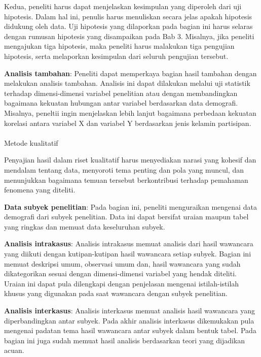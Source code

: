 \documentclass[
  indonesian,
  letterpaper,
]{scrbook}
\makeatletter
\let\oldparagraph\paragraph
\renewcommand{\paragraph}{
    \@ifstar
      \xxxParagraphStar
      \xxxParagraphNoStar
  }
\newcommand{\xxxParagraphStar}[1]{\oldparagraph*{#1}\mbox{}}
\newcommand{\xxxParagraphNoStar}[1]{\oldparagraph{#1}\mbox{}}
\makeatother
\begin{document}
Kedua, peneliti harus dapat menjelaskan kesimpulan yang diperoleh dari
uji hipotesis. Dalam hal ini, penulis harus menuliskan secara jelas
apakah hipotesis didukung oleh data. Uji hipotesis yang dilaporkan pada
bagian ini harus selaras dengan rumusan hipotesis yang disampaikan pada
Bab 3. Misalnya, jika peneliti mengajukan tiga hipotesis, maka peneliti
harus malakukan tiga pengujian hipotesis, serta melaporkan kesimpulan
dari seluruh pengujian tersebut.

\textbf{Analisis tambahan}: Peneliti dapat memperkaya bagian hasil
tambahan dengan melakukan analisis tambahan. Analisis ini dapat
dilakukan melalui uji statistik terhadap dimensi-dimensi variabel
penelitian atau dengan membandingkan bagaimana kekuatan hubungan antar
variabel berdasarkan data demografi. Misalnya, peneltii ingin
menjelaskan lebih lanjut bagaimana perbedaan kekuatan korelasi antara
variabel X dan variabel Y berdasarkan jenis kelamin partisipan.

\paragraph{Metode kualitatif}\label{metode-kualitatif}

Penyajian hasil dalam riset kualitatif harus menyediakan narasi yang
kohesif dan mendalam tentang data, menyoroti tema penting dan pola yang
muncul, dan menunjukkan bagaimana temuan tersebut berkontribusi terhadap
pemahaman fenomena yang diteliti.

\textbf{Data subyek penelitian}: Pada bagian ini, peneliti menguraikan
mengenai data demografi dari subyek penelitian. Data ini dapat bersifat
uraian maupun tabel yang ringkas dan memuat data keseluruhan subyek.

\textbf{Analisis intrakasus}: Analisis intrakasus memuat analisis dari
hasil wawancara yang diikuti dengan kutipan-kutipan hasil wawancara
setiap subyek. Bagian ini memuat deskripsi umum, observasi umum dan,
hasil wawancara yang sudah dikategorikan sesuai dengan dimensi-dimensi
variabel yang hendak diteliti. Uraian ini dapat pula dilengkapi dengan
penjelasan mengenai istilah-istilah khusus yang digunakan pada saat
wawancara dengan subyek penelitian.

\textbf{Analisis interkasus}: Analisis interkasus memuat analisis hasil
wawancara yang diperbandingkan antar subyek. Pada akhir analisis
interkasus dikemukakan pula mengenai padatan tema hasil wawancara antar
subyek dalam bentuk tabel. Pada bagian ini juga sudah memuat hasil
analisis berdasarkan teori yang dijadikan acuan.
\end{document}
